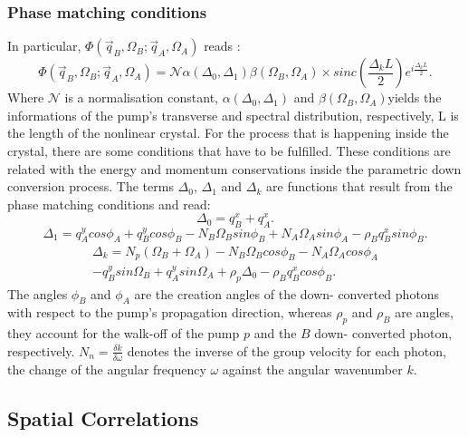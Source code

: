 \subsubsection{Phase matching conditions}
In particular, $\Phi(\vec{q}_B,\Omega_B;\vec{q}_A,\Omega_A)$ reads \cite{omar}:
\begin{equation}
\label{eq:mode}
\Phi(\vec{q}_B,\Omega_B;\vec{q}_A,\Omega_A) = \mathcal{N} \alpha(\Delta_0,\Delta_1) \beta(\Omega_B,\Omega_A) \times
sinc \left( \frac{\Delta_k L}{2} \right) e^{i \frac{\Delta_k L}{2}}.
\end{equation}
Where $\mathcal{N}$ is a normalisation constant, $\alpha(\Delta_0,\Delta_1)$
and $\beta(\Omega_B,\Omega_A)$yields the informations of the pump's transverse 
and spectral distribution, respectively, L is the length of the nonlinear crystal.
For the process that is happening inside the crystal, there are some conditions that have to be fulfilled. These conditions are related with the energy and momentum conservations inside the parametric down conversion process.
The terms $\Delta_0$, $\Delta_1$ and $\Delta_k$ are functions that result from the phase matching conditions and read:
\begin{equation}
\Delta_0=q_B^x + q_A^x.
\end{equation}
\begin{equation}
\Delta_1= q_A^y cos\phi_A + q_B^y cos\phi_B - N_B \Omega_B sin\phi_B + N_A \Omega_A sin\phi_A - \rho_B q_B^x sin\phi_B .
\end{equation}
\begin{equation}
\begin{split}
\Delta_k=N_p(\Omega_B+\Omega_A)-N_B\Omega_B cos\phi_B - N_A\Omega_A cos\phi_A \\ -q_B^y sin\Omega_B + q_A^y sin\Omega_A + \rho_p \Delta_0 - \rho_B q_B^x cos\phi_B.
\end{split}
\end{equation}
The angles $\phi_B$ and $\phi_A$ are the creation angles of the down-
converted photons with respect to the pump’s
propagation direction, whereas $\rho_p$ and $\rho_B$ are angles, they account for
the walk-off of the pump $p$ and the $B$ down-
converted photon, respectively.  $N_n=\frac{\delta k}{\delta \omega}$ denotes the inverse of the group velocity for each photon,
the change of the angular frequency $\omega$ against the angular wavenumber $k$.




\subsection{Spatial Correlations}\label{sec:spatialCorrelations}

